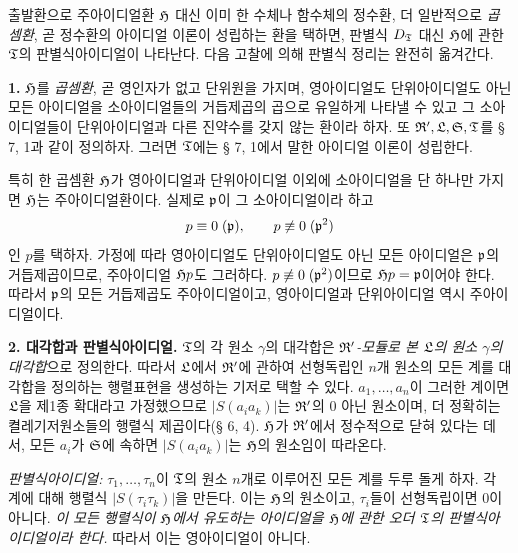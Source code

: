 출발환으로 주아이디얼환 \(\mathfrak H\) 대신 이미 한 수체나 함수체의 정수환, 더 일반적으로 \emph{곱셈환}, 곧 정수환의 아이디얼 이론이 성립하는 환을 택하면, 판별식 \(D_{\mathfrak{T}}\) 대신 \(\mathfrak H\)에 관한 \(\mathfrak{T}\)의 판별식아이디얼이 나타난다. 다음 고찰에 의해 판별식 정리는 완전히 옮겨간다.

\textbf{1.} \(\mathfrak H\)를 \emph{곱셈환}, 곧 영인자가 없고 단위원을 가지며, 영아이디얼도 단위아이디얼도 아닌 모든 아이디얼을 소아이디얼들의 거듭제곱의 곱으로 유일하게 나타낼 수 있고 그 소아이디얼들이 단위아이디얼과 다른 진약수를 갖지 않는 환이라 하자. 또 \(\mathfrak R',\mathfrak L,\mathfrak S,\mathfrak{T}\)를 § 7, 1과 같이 정의하자. 그러면 \(\mathfrak{T}\)에는 § 7, 1에서 말한 아이디얼 이론이 성립한다.

특히 한 곱셈환 \(\mathfrak H\)가 영아이디얼과 단위아이디얼 이외에 소아이디얼을 단 하나만 가지면 \(\mathfrak H\)는 주아이디얼환이다. 실제로 \(\mathfrak p\)이 그 소아이디얼이라 하고
\[
p\equiv0\;(\mathfrak p),\qquad p\not\equiv0\;(\mathfrak p^2)
\]
인 \(p\)를 택하자. 가정에 따라 영아이디얼도 단위아이디얼도 아닌 모든 아이디얼은 \(\mathfrak p\)의 거듭제곱이므로, 주아이디얼 \(\mathfrak H p\)도 그러하다. \(p\not\equiv0\;(\mathfrak p^2)\)이므로 \(\mathfrak H p=\mathfrak p\)이어야 한다. 따라서 \(\mathfrak p\)의 모든 거듭제곱도 주아이디얼이고, 영아이디얼과 단위아이디얼 역시 주아이디얼이다.

\textbf{2. 대각합과 판별식아이디얼.} \(\mathfrak{T}\)의 각 원소 \(\gamma\)의 대각합은 \emph{\(\mathfrak R'\)-모듈로 본 \(\mathfrak L\)의 원소 \(\gamma\)의 대각합}으로 정의한다. 따라서 \(\mathfrak L\)에서 \(\mathfrak R'\)에 관하여 선형독립인 \(n\)개 원소의 모든 계를 대각합을 정의하는 행렬표현을 생성하는 기저로 택할 수 있다. \(a_1,\ldots,a_n\)이 그러한 계이면 \(\mathfrak L\)을 제1종 확대라고 가정했으므로 \(|S(a_i a_k)|\)는 \(\mathfrak R'\)의 0 아닌 원소이며, 더 정확히는 켤레기저원소들의 행렬식 제곱이다(§ 6, 4). \(\mathfrak H\)가 \(\mathfrak R'\)에서 정수적으로 닫혀 있다는 데서, 모든 \(a_i\)가 \(\mathfrak S\)에 속하면 \(|S(a_i a_k)|\)는 \(\mathfrak H\)의 원소임이 따라온다.

\emph{판별식아이디얼:} \(\tau_1,\ldots,\tau_n\)이 \(\mathfrak{T}\)의 원소 \(n\)개로 이루어진 모든 계를 두루 돌게 하자. 각 계에 대해 행렬식 \(|S(\tau_i\tau_k)|\)을 만든다. 이는 \(\mathfrak H\)의 원소이고, \(\tau_i\)들이 선형독립이면 0이 아니다. \emph{이 모든 행렬식이 \(\mathfrak H\)에서 유도하는 아이디얼을 \(\mathfrak H\)에 관한 오더 \(\mathfrak{T}\)의 판별식아이디얼이라 한다.} 따라서 이는 영아이디얼이 아니다.

